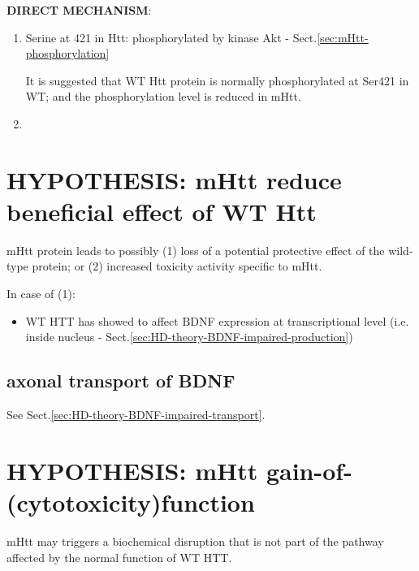 {\bf DIRECT MECHANISM}:
\begin{enumerate}

  \item Serine at 421 in Htt: phosphorylated by kinase Akt -
  Sect.\ref{sec:mHtt-phosphorylation}
  
It is suggested that WT Htt protein is normally phosphorylated at Ser421 in WT;
and the phosphorylation level is reduced in mHtt. 
  

  \item   
\end{enumerate}
  


\section{HYPOTHESIS: mHtt reduce beneficial effect of WT Htt}

mHtt protein leads to possibly (1) loss of a potential protective effect of the
wild-type protein; or (2) increased toxicity activity specific to mHtt.

In case of (1):
\begin{itemize}
  \item WT HTT has showed to affect BDNF expression at transcriptional level
  (i.e. inside nucleus - Sect.\ref{sec:HD-theory-BDNF-impaired-production})
\end{itemize}

\subsection{axonal transport of BDNF}

See Sect.\ref{sec:HD-theory-BDNF-impaired-transport}.

\section{HYPOTHESIS: mHtt gain-of-(cytotoxicity)function }
\label{sec:pathogenesis-Huntington}

mHtt may triggers a biochemical disruption that is not part of the pathway
affected by the normal function of WT HTT.

